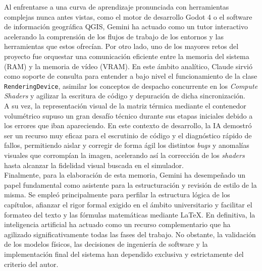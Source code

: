     Al enfrentarse a una curva de aprendizaje pronunciada con herramientas complejas nunca antes vistas, como el motor de desarrollo Godot 4 o el software de información geográfica QGIS, Gemini ha actuado como un tutor interactivo acelerando la comprensión de los flujos de trabajo de los entornos y las herramientas que estos ofrecían. Por otro lado, uno de los mayores retos del proyecto fue orquestar una comunicación eficiente entre la memoria del sistema (RAM) y la memoria de vídeo (VRAM). En este ámbito analítico, Claude sirvió como soporte de consulta para entender a bajo nivel el funcionamiento de la clase \texttt{RenderingDevice}, asimilar los conceptos de despacho concurrente en los \textit{Compute Shaders} y agilizar la escritura de código y depuración de dicha sincronización.\\

    A su vez, la representación visual de la matriz térmica mediante el contenedor volumétrico supuso un gran desafío técnico durante sus etapas iniciales debido a los errores que iban apareciendo. En este contexto de desarrollo, la IA demostró ser un recurso muy eficaz para el escrutinio de código y el diagnóstico rápido de fallos, permitiendo aislar y corregir de forma ágil los distintos \textit{bugs} y anomalías visuales que corrompían la imagen, acelerando así la corrección de los \textit{shaders} hasta alcanzar la fidelidad visual buscada en el simulador.\\

    Finalmente, para la elaboración de esta memoria, Gemini ha desempeñado un papel fundamental como asistente para la estructuración y revisión de estilo de la misma. Se empleó principalmente para perfilar la estructura lógica de los capítulos, afianzar el rigor formal exigido en el ámbito universitario y facilitar el formateo del texto y las fórmulas matemáticas mediante \LaTeX. En definitiva, la inteligencia artificial ha actuado como un recurso complementario que ha agilizado significativamente todas las fases del trabajo. No obstante, la validación de los modelos físicos, las decisiones de ingeniería de software y la implementación final del sistema han dependido exclusiva y estrictamente del criterio del autor.\\



